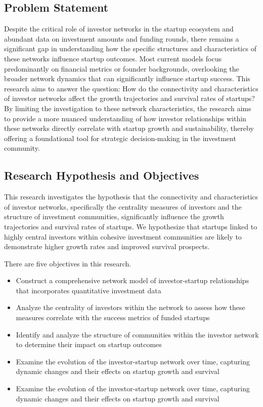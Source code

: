 \documentclass[a4paper,11pt]{article}
\begin{document}
\subsection{Problem Statement}
Despite the critical role of investor networks in the startup ecosystem and abundant data on investment amounts and funding rounds, there remains a significant gap in understanding how the specific structures and characteristics of these networks influence startup outcomes. Most current models focus predominantly on financial metrics or founder backgrounds, overlooking the broader network dynamics that can significantly influence startup success. This research aims to answer the question: How do the connectivity and characteristics of investor networks affect the growth trajectories and survival rates of startups? By limiting the investigation to these network characteristics, the research aims to provide a more nuanced understanding of how investor relationships within these networks directly correlate with startup growth and sustainability, thereby offering a foundational tool for strategic decision-making in the investment community.

\subsection{Research Hypothesis and Objectives}
This research investigates the hypothesis that the connectivity and characteristics of investor networks, specifically the centrality measures of investors and the structure of investment communities, significantly influence the growth trajectories and survival rates of startups. We hypothesize that startups linked to highly central investors within cohesive investment communities are likely to demonstrate higher growth rates and improved survival prospects.

There are five objectives in this research. 
\begin{itemize}
    \item Construct a comprehensive network model of investor-startup relationships that incorporates quantitative investment data
    \item Analyze the centrality of investors within the network to assess how these measures correlate with the success metrics of funded startups
    \item Identify and analyze the structure of communities within the investor network to determine their impact on startup outcomes
    \item Examine the evolution of the investor-startup network over time, capturing dynamic changes and their effects on startup growth and survival
    \item Examine the evolution of the investor-startup network over time, capturing dynamic changes and their effects on startup growth and survival
\end{itemize}
\end{document}

